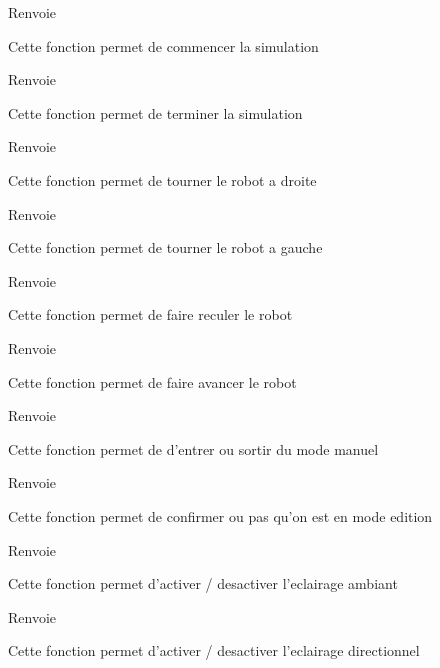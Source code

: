 \begin{DoxyReturn}{Renvoie}

\end{DoxyReturn}
Cette fonction permet de commencer la simulation

\begin{DoxyReturn}{Renvoie}

\end{DoxyReturn}
Cette fonction permet de terminer la simulation

\begin{DoxyReturn}{Renvoie}

\end{DoxyReturn}
Cette fonction permet de tourner le robot a droite

\begin{DoxyReturn}{Renvoie}

\end{DoxyReturn}
Cette fonction permet de tourner le robot a gauche

\begin{DoxyReturn}{Renvoie}

\end{DoxyReturn}
Cette fonction permet de faire reculer le robot

\begin{DoxyReturn}{Renvoie}

\end{DoxyReturn}
Cette fonction permet de faire avancer le robot

\begin{DoxyReturn}{Renvoie}

\end{DoxyReturn}
Cette fonction permet de d'entrer ou sortir du mode manuel

\begin{DoxyReturn}{Renvoie}

\end{DoxyReturn}
Cette fonction permet de confirmer ou pas qu'on est en mode edition

\begin{DoxyReturn}{Renvoie}

\end{DoxyReturn}
Cette fonction permet d'activer / desactiver l'eclairage ambiant

\begin{DoxyReturn}{Renvoie}

\end{DoxyReturn}
Cette fonction permet d'activer / desactiver l'eclairage directionnel

